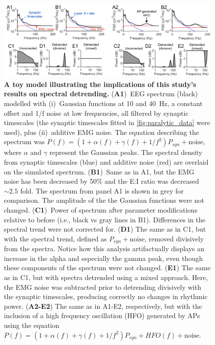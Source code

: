 \begin{figure}[t!]
    \centering
    \hspace*{-1.25cm}
    \includegraphics[width=18cm]{Figures/chapter3/figure7.png}
    \caption{\textbf{A toy model illustrating the implications of this study's results on spectral detrending.} (\textbf{A1})~EEG spectrum (black) modelled with (i)~Gaussian functions at 10 and 40~\unit{\hertz}, a constant offset and 1/f noise at low frequencies, all filtered by synaptic timescales (the synaptic timescales fitted in {\autoref{fig:paralytic_data}} were used), plus (ii)~additive EMG noise. The equation describing the spectrum was $P(f)=(1+\alpha(f)+\gamma(f)+1/f^2)P_{syn}+\mathrm{noise}$, where $\alpha$ and $\gamma$ represent the Gaussian peaks. The spectral density from synaptic timescales (blue) and additive noise (red) are overlaid on the simulated spectrum. (\textbf{B1})~Same as in A1, but the EMG noise has been decreased by 50\% and the E:I ratio was decreased ${\sim}2.5$ fold. The spectrum from panel A1 is shown in grey for comparison. The amplitude of the the Gaussian functions were not changed. (\textbf{C1})~Power of spectrum after parameter modifications relative to before (i.e., black vs gray lines in B1). Differences in the spectral trend were not corrected for. (\textbf{D1}) The same as in C1, but with the spectral trend, defined as $P_{syn}+\mathrm{noise}$, removed divisively from the spectra. Notice how this analysis artifactually displays an increase in the alpha and especially the gamma peak, even though these components of the spectrum were not changed. (\textbf{E1}) The same as in C1, but with spectra detrended using a mixed approach. Here, the EMG noise was subtracted prior to detrending divisively with the synaptic timescales, producing correctly no changes in rhythmic power. (\textbf{A2-E2}) The same as in A1-E2, respectively, but with the inclusion of a high frequency oscillation (HFO) generated by APs using the equation $P(f)=(1+\alpha(f)+\gamma(f)+1/f^2)P_{syn}+HFO(f)+\mathrm{noise}$.}
    \label{fig:detrending}
\end{figure}

